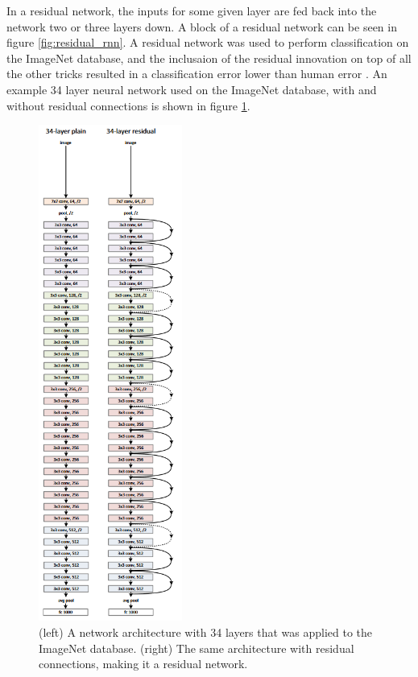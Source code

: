 \documentclass[a4paper,12pt]{article}
\theoremstyle{definition}
\begin{document}
In a residual network, the inputs for some given layer are fed back into the network two or three layers down. A block of a residual network can be seen in figure \ref{fig:residual_rnn}. A residual network was used to perform classification on the ImageNet database, and the inclusaion of the residual innovation on top of all the other tricks resulted in a classification error lower than human error \cite{resnet}. An example 34 layer neural network used on the ImageNet database, with and without residual connections is shown in figure \ref{fig:resnet}.
\begin{figure}[p]
	\centering
	\includegraphics[width=0.42\textwidth]{figures/resnet.png}
	\caption{(left) A network architecture with 34 layers that was applied to the ImageNet database. (right) The same architecture with residual connections, making it a residual network.}
	\label{fig:resnet}
\end{figure}
\end{document}
